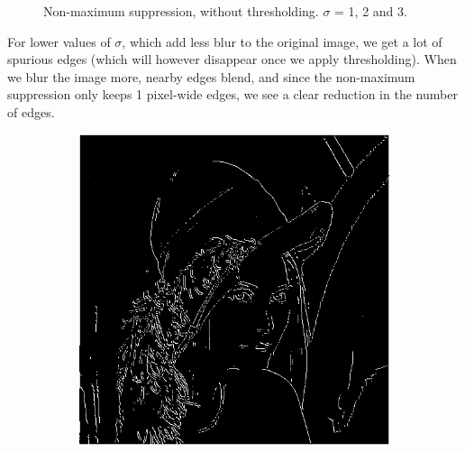 \documentclass[a4paper]{article}
\begin{document}
\begin{figure}[h]
\begin{subfigure}{0.33\textwidth}
\end{subfigure}

\caption{Non-maximum suppression, without thresholding. $\sigma$ = 1, 2 and 3.}

\end{figure}

\FloatBarrier

For lower values of $\sigma$, which add less blur to the original image, we get a lot of spurious edges (which will however disappear once we apply thresholding).
When we blur the image more, nearby edges blend, and since the non-maximum suppression only keeps 1 pixel-wide edges, we see a clear reduction in the number of edges.

\begin{figure}[h]

\begin{subfigure}{0.33\textwidth}
\includegraphics[width=\textwidth]{img/sigma1/lenanont.png}
\end{subfigure}
\begin{subfigure}{0.33\textwidth}

\end{subfigure}
\end{figure}
\end{document}
